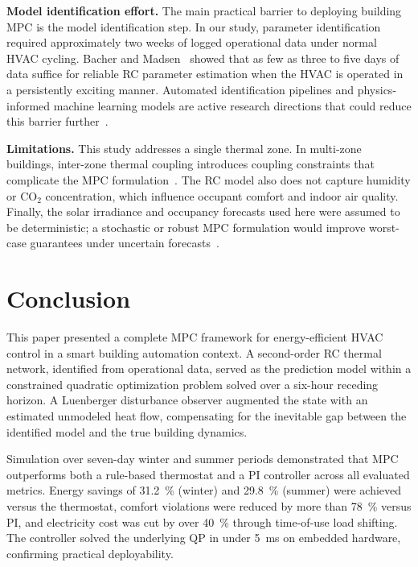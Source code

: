 \documentclass[conference,a4paper]{IEEEtran}[2015/08/26]
\begin{document}
\textbf{Model identification effort.}
The main practical barrier to deploying building MPC is the model
identification step. In our study, parameter identification required
approximately two weeks of logged operational data under normal HVAC
cycling. Bacher and Madsen~\cite{Bacher2011} showed that as few as
three to five days of data suffice for reliable RC parameter estimation
when the HVAC is operated in a persistently exciting
manner. Automated identification pipelines and physics-informed machine
learning models are active research directions that could reduce this
barrier further~\cite{Privara2013,Yang2015}.

\textbf{Limitations.}
This study addresses a single thermal zone. In multi-zone buildings,
inter-zone thermal coupling introduces coupling constraints that
complicate the MPC formulation~\cite{Morosan2010}. The RC model
also does not capture humidity or CO$_2$ concentration, which influence
occupant comfort and indoor air quality. Finally, the solar irradiance
and occupancy forecasts used here were assumed to be deterministic; a
stochastic or robust MPC formulation would improve worst-case guarantees
under uncertain forecasts~\cite{Oldewurtel2010}.

\section{Conclusion}
\label{sec:conclusion}

This paper presented a complete MPC framework for energy-efficient HVAC
control in a smart building automation context. A second-order RC
thermal network, identified from operational data, served as the
prediction model within a constrained quadratic optimization problem
solved over a six-hour receding horizon. A Luenberger disturbance
observer augmented the state with an estimated unmodeled heat flow,
compensating for the inevitable gap between the identified model and the
true building dynamics.

Simulation over seven-day winter and summer periods demonstrated that
MPC outperforms both a rule-based thermostat and a PI controller across
all evaluated metrics. Energy savings of \SI{31.2}{\percent} (winter)
and \SI{29.8}{\percent} (summer) were achieved versus the thermostat,
comfort violations were reduced by more than \SI{78}{\percent} versus
PI, and electricity cost was cut by over \SI{40}{\percent} through
time-of-use load shifting. The controller solved the underlying QP in
under \SI{5}{\milli\second} on embedded hardware, confirming practical
deployability.
\end{document}
